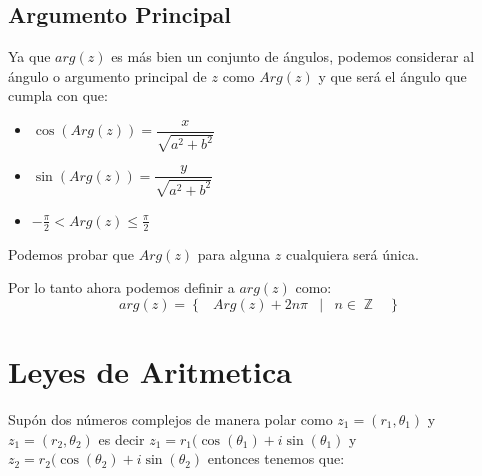 \documentclass[12pt, fleqn]{report}                             %
\DeclareMathOperator \Space {\quad}                             %
\DeclareMathOperator \MiniSpace {\;}                            %
\newcommand \Such {\MiniSpace|\MiniSpace}                       %
\newcommand{\Set}[1]{\left\{ \MiniSpace #1 \MiniSpace \right\}} %
\newcommand{\Wrap}[1]{\left( #1 \right)}                        %
\DeclareMathOperator \Integers  {\mathbb{Z}}                     %
\newcommand{\Cos}[1]{\cos\Wrap{#1}}                             %
\newcommand{\Sin}[1]{\sin\Wrap{#1}}                             %
\begin{document}
            \subsection*{Argumento Principal}

                Ya que $arg(z)$ es más bien un conjunto de ángulos, podemos considerar al ángulo o 
                argumento principal de $z$ como $Arg(z)$ y que será el ángulo que cumpla con que:

                \begin{itemize}
                    \item $\Cos{Arg(z)} = \dfrac{x}{\sqrt{a^2+b^2}}$
                    \item $\Sin{Arg(z)}   = \dfrac{y}{\sqrt{a^2+b^2}}$
                    \item $-\frac{\pi}{2} < Arg(z) \leq \frac{\pi}{2}$
                \end{itemize}

                Podemos probar que $Arg(z)$ para alguna $z$ cualquiera será única.

                Por lo tanto ahora podemos definir a $arg(z)$ como:
                \begin{equation}
                    arg(z) = \Set{ Arg(z) + 2n\pi \Such n \in \Integers }
                \end{equation}


        \clearpage
        \section{Leyes de Aritmetica}
            
            Supón dos números complejos de manera polar como $z_1 = (r_1, \theta_1)$ y $z_1 = (r_2, \theta_2)$ 
            es decir $z_1 = r_1(\Cos{\theta_1} + i\Sin{\theta_1}$ y
            $z_2 = r_2(\Cos{\theta_2} + i\Sin{\theta_2}$ entonces tenemos que:
\end{document}
